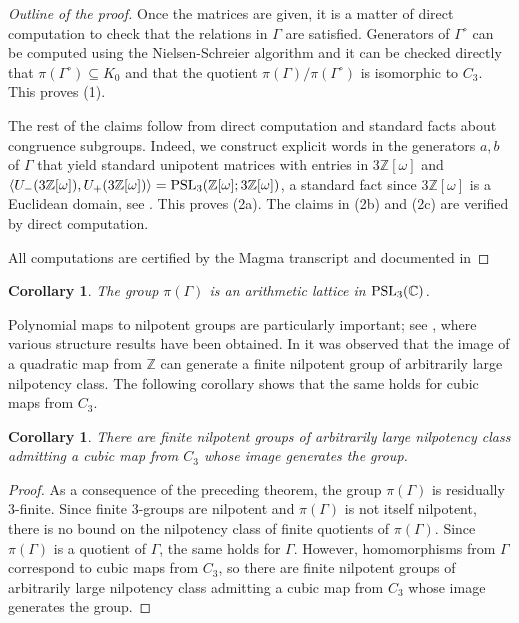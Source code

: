 \documentclass[11pt, a4paper]{amsproc}
\newtheorem{corollary}[cor]{Corollary}
\theoremstyle{remark}
\theoremstyle{plain}
\begin{document}
\begin{proof}[Outline of the proof]
Once the matrices are given, it is a matter of direct computation to check that the relations in $\Gamma$ are satisfied. Generators of $\Gamma^\circ$ can be computed using the Nielsen-Schreier algorithm and it can be checked directly that $\pi(\Gamma^\circ)\subseteq K_0$ and that the quotient $\pi(\Gamma)/\pi(\Gamma^\circ)$ is isomorphic to $C_3$. This proves (1).

The rest of the claims follow from direct computation and standard facts about congruence subgroups. Indeed, we construct explicit words in the generators $a,b$ of $\Gamma$ that yield standard unipotent matrices with entries in $3 \mathbb Z[\omega]$ and $\langle U_-(3 \mathbb Z[\omega]), U_+( 3 \mathbb Z[\omega])\rangle={\rm PSL}_3(\mathbb Z[\omega]; 3 \mathbb Z[\omega])$, a standard fact since $3\mathbb Z[\omega]$ is a Euclidean domain, see \cite{bass}. This proves (2a). The claims in (2b) and (2c) are verified by direct computation.

All computations are certified by the Magma transcript  and documented in \end{proof}

\begin{corollary}
The group $\pi(\Gamma)$ is an arithmetic lattice in ${\rm PSL}_3(\mathbb C)$.
\end{corollary}

Polynomial maps to nilpotent groups are particularly important; see \cite{MR1910931}, where various structure results have been obtained. In \cite[Remark 4.2]{AJ} it was observed that the image of a quadratic map from $\mathbb Z$ can generate a finite nilpotent group of arbitrarily large nilpotency class. The following corollary shows that the same holds for cubic maps from $C_3$.

\begin{corollary}
There are finite nilpotent groups of arbitrarily large nilpotency class admitting a cubic map from $C_3$ whose image generates the group.
\end{corollary}
\begin{proof}
As a consequence of the preceding theorem, the group $\pi(\Gamma)$ is residually $3$-finite. Since finite $3$-groups are nilpotent and $\pi(\Gamma)$ is not itself nilpotent, there is no bound on the nilpotency class of finite quotients of $\pi(\Gamma)$. Since $\pi(\Gamma)$ is a quotient of $\Gamma$, the same holds for $\Gamma$. However, homomorphisms from $\Gamma$ correspond to cubic maps from $C_3$, so there are finite nilpotent groups of arbitrarily large nilpotency class admitting a cubic map from $C_3$ whose image generates the group.
\end{proof}
\end{document}
